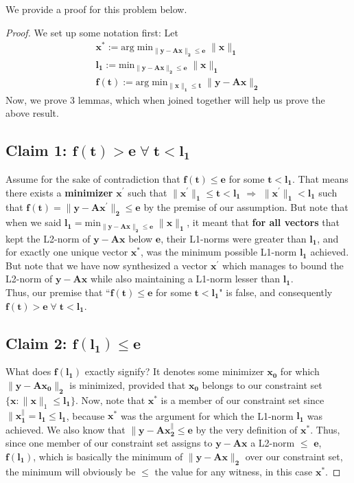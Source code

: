 \documentclass[a4paper,11pt]{article}
\numberwithin{definition}{section}
\numberwithin{mytheorem}{subsection}
\begin{document}
We provide a proof for this problem below.
\begin{proof}
We set up some notation first: Let 
\begin{gather*}
    \boldsymbol{x^*} :=  \mathrm{arg\;min}\boldsymbol{_{\lVert y - Ax\rVert_2 \leq e}\;\lVert x\rVert_1} \\
    \boldsymbol{l_1 := } \mathrm{min}\boldsymbol{_{\lVert y - Ax\rVert_2 \leq e}\;\lVert x\rVert_1} \\
    \boldsymbol{f(t) := } \mathrm{arg\;min}\boldsymbol{_{\lVert x\rVert_1 \leq t}\; \lVert y - Ax\rVert_2} 
\end{gather*}
Now, we prove 3 lemmas, which when joined together will help us prove the above result.
\subsection{Claim 1: $\boldsymbol{f(t) > e}\;\forall\;\boldsymbol{t < l_1}$}
Assume for the sake of contradiction that $\boldsymbol{f(t) \leq e}$ for some $\boldsymbol{t < l_1}$. That means there exists a \textbf{minimizer} $\boldsymbol{x^{\prime}}$ such that $\boldsymbol{\lVert x^{\prime}\rVert_1\leq t < l_1}$ $\Rightarrow$ $\boldsymbol{\lVert x^{\prime}\rVert_1 < l_1}$ such that $\boldsymbol{f(t) = \lVert y - Ax^{\prime}\rVert_2 \leq e}$ by the premise of our assumption. But note that when we said $\boldsymbol{l_1 = } \mathrm{min}\boldsymbol{_{\lVert y - Ax\rVert_2 \leq e}\;\lVert x\rVert_1}$, it meant that \textbf{for all vectors} that kept the L2-norm of $\boldsymbol{y-Ax}$ below $\boldsymbol{e}$, their L1-norms were greater than $\boldsymbol{l_1}$, and for exactly one unique vector $\boldsymbol{x^*}$, was the minimum possible L1-norm $\boldsymbol{l_1}$ achieved. But note that we have now synthesized a vector $\boldsymbol{x^{\prime}}$ which manages to bound the L2-norm of $\boldsymbol{y-Ax}$ while also maintaining a L1-norm lesser than $\boldsymbol{l_1}$.\\
Thus, our premise that ``$\boldsymbol{f(t) \leq e}$ for some $\boldsymbol{t < l_1}$" is false, and consequently $\boldsymbol{f(t) > e}\;\forall\;\boldsymbol{t < l_1}$.
\subsection{Claim 2: $\boldsymbol{f(l_1) \leq e}$}
What does $\boldsymbol{f(l_1)}$ exactly signify? It denotes some minimizer $\boldsymbol{x_0}$ for which $\boldsymbol{\lVert y - Ax_0\rVert_2}$ is minimized, provided that $\boldsymbol{x_0}$ belongs to our constraint set $\{\boldsymbol{x}: \lVert\boldsymbol{x}\rVert_1 \leq \boldsymbol{l_1}\}$. Now, note that $\boldsymbol{x^*}$ is a member of our constraint set since $\boldsymbol{\lVert x^\rVert_1 = l_1 \leq l_1}$, because $\boldsymbol{x^*}$ was the argument for which the L1-norm $\boldsymbol{l_1}$ was achieved. We also know that $\boldsymbol{\lVert y - Ax^\rVert_2 \leq e}$ by the very definition of $\boldsymbol{x^*}$. Thus, since one member of our constraint set assigns to $\boldsymbol{y-Ax}$ a L2-norm $\leq$ $\boldsymbol{e}$, $\boldsymbol{f(l_1)}$, which is basically the minimum of $\boldsymbol{\lVert y - Ax\rVert_2}$ over our constraint set, the minimum will obviously be $\leq$ the value for any witness, in this case $\boldsymbol{x^*}$.

\end{proof}
\end{document}
